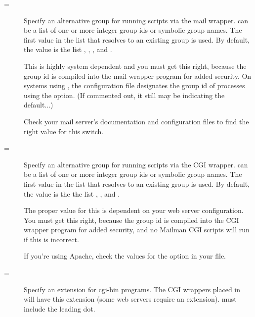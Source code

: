 \documentclass{howto}
\begin{document}
\begin{description}
\item[=]
    Specify an alternative group for running scripts via the mail wrapper.
     can be a list of one or more integer group ids or
    symbolic group names.  The first value in the list that resolves to an
    existing group is used.  By default, the value is the list ,
    , , and .

    \begin{notice}[note]
    This is highly system dependent and you must get this right, because the
    group id is compiled into the mail wrapper program for added security.  On
    systems using , the  configuration
    file designates the group id of  processes using the
     option.  (If commented out, it still may be indicating
    the default...)
    \end{notice}

    Check your mail server's documentation and configuration files to find the
    right value for this switch.

\item[=]
    Specify an alternative group for running scripts via the CGI wrapper.
     can be a list of one or more integer group ids or
    symbolic group names.  The first value in the list that resolves to an
    existing group is used.  By default, the value is the the list
    , , and .

    \begin{notice}[note]
    The proper value for this is dependent on your web server configuration.
    You must get this right, because the group id is compiled into the CGI
    wrapper program for added security, and no Mailman CGI scripts will run if
    this is incorrect.
    \end{notice}

    If you're using Apache, check the values for the  option in
    your  file.

\item[=]
    Specify an extension for cgi-bin programs.  The CGI wrappers placed in
     will have this extension (some web servers
    require an extension).   must include the leading dot.


\end{description}
\end{document}
